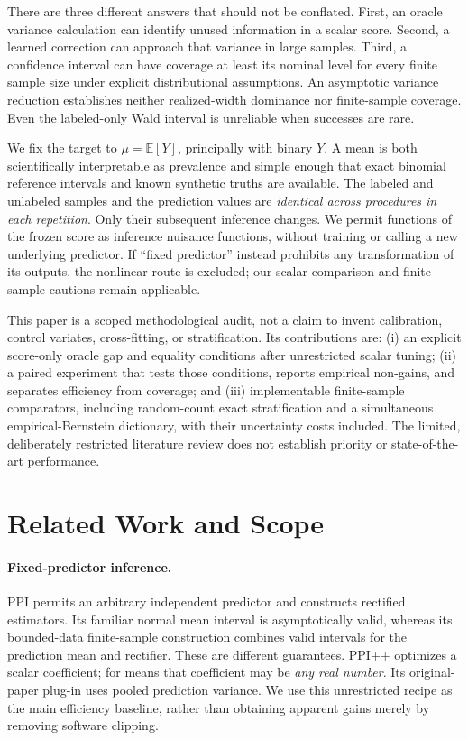 \documentclass{article}
\newcommand{\E}{\mathbb{E}}
\begin{document}
There are three different answers that should not be conflated. First, an oracle variance calculation can identify unused information in a scalar score. Second, a learned correction can approach that variance in large samples. Third, a confidence interval can have coverage at least its nominal level for every finite sample size under explicit distributional assumptions. An asymptotic variance reduction establishes neither realized-width dominance nor finite-sample coverage. Even the labeled-only Wald interval is unreliable when successes are rare.

We fix the target to $\mu=\E[Y]$, principally with binary $Y$. A mean is both scientifically interpretable as prevalence and simple enough that exact binomial reference intervals and known synthetic truths are available. The labeled and unlabeled samples and the prediction values are \emph{identical across procedures in each repetition}. Only their subsequent inference changes. We permit functions of the frozen score as inference nuisance functions, without training or calling a new underlying predictor. If ``fixed predictor'' instead prohibits any transformation of its outputs, the nonlinear route is excluded; our scalar comparison and finite-sample cautions remain applicable.

This paper is a scoped methodological audit, not a claim to invent calibration, control variates, cross-fitting, or stratification. Its contributions are: (i) an explicit score-only oracle gap and equality conditions after unrestricted scalar tuning; (ii) a paired experiment that tests those conditions, reports empirical non-gains, and separates efficiency from coverage; and (iii) implementable finite-sample comparators, including random-count exact stratification and a simultaneous empirical-Bernstein dictionary, with their uncertainty costs included. The limited, deliberately restricted literature review does not establish priority or state-of-the-art performance.

\section{Related Work and Scope}
\paragraph{Fixed-predictor inference.}
PPI \citep{ppi} permits an arbitrary independent predictor and constructs rectified estimators. Its familiar normal mean interval is asymptotically valid, whereas its bounded-data finite-sample construction combines valid intervals for the prediction mean and rectifier. These are different guarantees. PPI++ \citep{ppipp} optimizes a scalar coefficient; for means that coefficient may be \emph{any real number}. Its original-paper plug-in uses pooled prediction variance. We use this unrestricted recipe as the main efficiency baseline, rather than obtaining apparent gains merely by removing software clipping.
\end{document}
